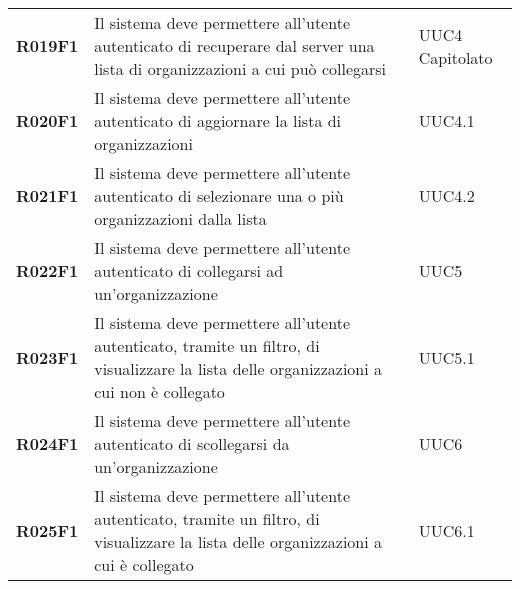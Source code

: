\documentclass[../analisi-dei-requisiti.tex]{subfiles}
\begin{document}
\begin{longtable}[H]{>{\centering\bfseries}m{3cm} >{\centering}m{10cm} >{\centering\arraybackslash}m{3cm}}
  R019F1                  & Il sistema deve permettere all'utente autenticato di recuperare dal server una lista di organizzazioni a cui può collegarsi                                                        & UUC4 Capitolato               \\
  R020F1                  & Il sistema deve permettere all'utente autenticato di aggiornare la lista di organizzazioni                                                                                         & UUC4.1                        \\
  R021F1                  & Il sistema deve permettere all'utente autenticato di selezionare una o più organizzazioni dalla lista                                                                              & UUC4.2                        \\
  R022F1                  & Il sistema deve permettere all'utente autenticato di collegarsi ad un'organizzazione                                                                                               & UUC5                          \\
  R023F1                  & Il sistema deve permettere all'utente autenticato, tramite un filtro, di visualizzare la lista delle organizzazioni a cui non è collegato                                          & UUC5.1                        \\
  R024F1                  & Il sistema deve permettere all'utente autenticato di scollegarsi da un'organizzazione                                                                                              & UUC6                          \\
  R025F1                  & Il sistema deve permettere all'utente autenticato, tramite un filtro, di visualizzare la lista delle organizzazioni a cui è collegato                                              & UUC6.1                        \\


\end{longtable}
\end{document}
